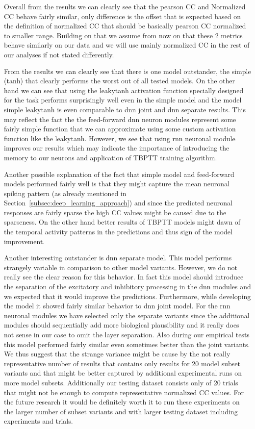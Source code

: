 Overall from the results we can clearly see that the pearson CC and Normalized CC behave fairly similar, only difference is the offset that is expected based on the definition of normalized CC that should be basically pearson CC normalized to smaller range. Building on that we assume from now on that these 2 metrics behave similarly on our data and we will use mainly normalized CC in the rest of our analyses if not stated differently.

From the results we can clearly see that there is one model outstander, the simple (tanh) that clearly performs the worst out of all tested models. On the other hand we can see that using the leakytanh activation function specially designed for the task performs surprisingly well even in the simple model and the model simple leakytanh is even comparable to dnn joint and dnn separate results. This may reflect the fact the the feed-forward dnn neuron modules represent some fairly simple function that we can approximate using some custom activation function like the leakytanh. However, we see that using rnn neuronal module improves our results which may indicate the importance of introducing the memory to our neurons and application of TBPTT training algorithm. 

Another possible explanation of the fact that simple model and feed-forward models performed fairly well is that they might capture the mean neuronal spiking pattern (as already mentioned in Section~\ref{subsec:deep_learning_approach}) and since the predicted neuronal responses are fairly sparse the high CC values might be caused due to the sparseness. On the other hand better results of TBPTT models might dawn of the temporal activity patterns in the predictions and thus sign of the model improvement.

Another interesting outstander is dnn separate model. This model performs strangely variable in comparison to other model variants. However, we do not really see the clear reason for this behavior. In fact this model should introduce the separation of the excitatory and inhibitory processing in the dnn modules and we expected that it would improve the predictions. Furthermore, while developing the model it showed fairly similar behavior to dnn joint model. For the rnn neuronal modules we have selected only the separate variants since the additional modules should sequentially add more biological plausibility and it really does not sense in our case to omit the layer separation. Also during our empirical tests this model performed fairly similar even sometimes better than the joint variants. We thus suggest that the strange variance might be cause by the not really representative number of results that contains only results for 20 model subset variants and that might be better captured by additional experimental runs on more model subsets. Additionally our testing dataset consists only of 20 trials that might not be enough to compute representative normalized CC values. For the future research it would be definitely worth it to run these experiments on the larger number of subset variants and with larger testing dataset including experiments and trials.

